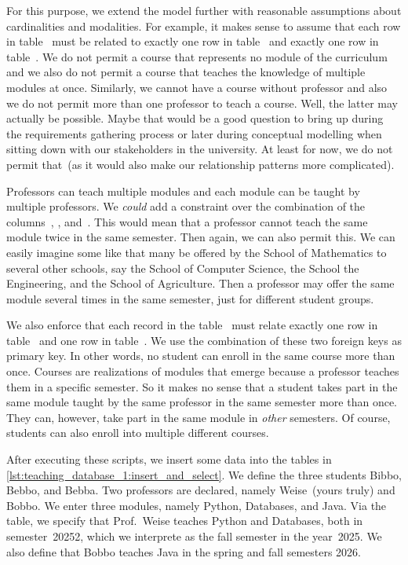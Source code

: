 For this purpose, we extend the model further with reasonable assumptions about cardinalities and modalities.
For example, it makes sense to assume that each row in table~ must be related to exactly one row in table~ and exactly one row in table~.
We do not permit a course that represents no module of the curriculum and we also do not permit a course that teaches the knowledge of multiple modules at once.
Similarly, we cannot have a course without professor and also we do not permit more than one professor to teach a course.
Well, the latter may actually be possible.
Maybe that would be a good question to bring up during the requirements gathering process or later during conceptual modelling when sitting down with our stakeholders in the university.
At least for now, we do not permit that~(as it would also make our relationship patterns more complicated).

Professors can teach multiple modules and each module can be taught by multiple professors.
We \emph{could} add a  constraint over the combination of the columns~, , and~.
This would mean that a professor cannot teach the same module twice in the same semester.
Then again, we can also permit this.
We can easily imagine some  like  that many be offered by the School of Mathematics to several other schools, say the School of Computer Science, the School the Engineering, and the School of Agriculture.
Then a professor may offer the same module several times in the same semester, just for different student groups.

We also enforce that each record in the table~ must relate exactly one row in table~ and one row in table~.
We use the combination of these two foreign keys as primary key.
In other words, no student can enroll in the same course more than once.
Courses are realizations of modules that emerge because a professor teaches them in a specific semester.
So it makes no sense that a student takes part in the same module taught by the same professor in the same semester more than once.
They can, however, take part in the same module in \emph{other} semesters.
Of course, students can also enroll into multiple different courses.

After executing these scripts, we insert some data into the tables in \cref{lst:teaching_database_1:insert_and_select}.
We define the three students Bibbo, Bebbo, and Bebba.
Two professors are declared, namely Weise~(yours truly) and Bobbo.
We enter three modules, namely Python, Databases, and Java.
Via the  table, we specify that Prof.~Weise teaches Python and Databases, both in semester~20252, which we interprete as the fall semester in the year~2025.
We also define that Bobbo teaches Java in the spring and fall semesters 2026.

